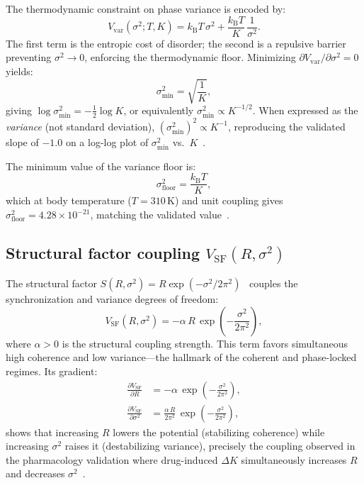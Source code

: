 \documentclass[twocolumn,aps,prl,superscriptaddress,floatfix]{revtex4-2}
\newcommand{\kB}{k_{\mathrm{B}}}
\newcommand{\sigmin}{\sigma^2_{\mathrm{min}}}
\begin{document}
The thermodynamic constraint on phase variance is encoded by:
\begin{equation}
V_{\mathrm{var}}(\sigma^2; T, K) = \kB T\,\sigma^2 + \frac{\kB T}{K}\,\frac{1}{\sigma^2}.
\label{eq:vvar}
\end{equation}
The first term is the entropic cost of disorder; the second is a repulsive barrier preventing $\sigma^2 \to 0$, enforcing the thermodynamic floor.
Minimizing $\partial V_{\mathrm{var}}/\partial \sigma^2 = 0$ yields:
\begin{equation}
\sigmin = \sqrt{\frac{1}{K}},
\label{eq:sigma_min}
\end{equation}
giving $\log \sigmin = -\tfrac{1}{2}\log K$, or equivalently $\sigmin \propto K^{-1/2}$.
When expressed as the \emph{variance} (not standard deviation), $(\sigmin)^2 \propto K^{-1}$, reproducing the validated slope of $-1.0$ on a log-log plot of $\sigma^2_{\mathrm{min}}$ vs.\ $K$~\cite{sachikonye2026operator}.

The minimum value of the variance floor is:
\begin{equation}
\sigma^2_{\mathrm{floor}} = \frac{\kB T}{K},
\label{eq:floor}
\end{equation}
which at body temperature ($T = 310\,$K) and unit coupling gives $\sigma^2_{\mathrm{floor}} = 4.28 \times 10^{-21}$, matching the validated value~\cite{sachikonye2026operator}.

\subsection{Structural factor coupling $V_{\mathrm{SF}}(R, \sigma^2)$}
\label{sec:vsf}

The structural factor $S(R, \sigma^2) = R\exp(-\sigma^2/2\pi^2)$~\cite{sachikonye2026regime} couples the synchronization and variance degrees of freedom:
\begin{equation}
V_{\mathrm{SF}}(R, \sigma^2) = -\alpha\,R\,\exp\!\left(-\frac{\sigma^2}{2\pi^2}\right),
\label{eq:vsf}
\end{equation}
where $\alpha > 0$ is the structural coupling strength.
This term favors simultaneous high coherence and low variance---the hallmark of the coherent and phase-locked regimes.
Its gradient:
\begin{align}
\frac{\partial V_{\mathrm{SF}}}{\partial R} &= -\alpha\,\exp\!\left(-\frac{\sigma^2}{2\pi^2}\right), \\
\frac{\partial V_{\mathrm{SF}}}{\partial \sigma^2} &= \frac{\alpha\,R}{2\pi^2}\,\exp\!\left(-\frac{\sigma^2}{2\pi^2}\right),
\end{align}
shows that increasing $R$ lowers the potential (stabilizing coherence) while increasing $\sigma^2$ raises it (destabilizing variance), precisely the coupling observed in the pharmacology validation where drug-induced $\Delta K$ simultaneously increases $R$ and decreases $\sigma^2$~\cite{sachikonye2026aperture}.
\end{document}
